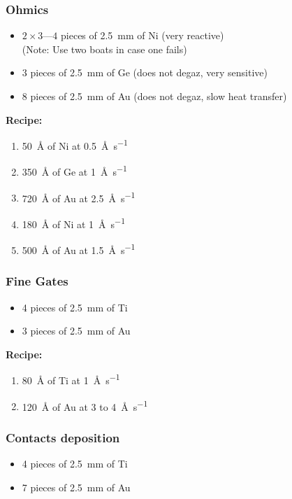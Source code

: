 \subsubsection{Ohmics}
\begin{itemize}
\item $2 \times 3\text{---}4$ pieces of \SI{2.5}{\milli\meter} of Ni (very reactive)\\
  (Note: Use two boats in case one fails)
\item 3 pieces of \SI{2.5}{\milli\meter} of Ge (does not degaz, very sensitive)
\item 8 pieces of \SI{2.5}{\milli\meter} of Au (does not degaz, slow heat transfer)
\end{itemize}

\textbf{Recipe: }
\begin{enumerate}[label=\protect\nth{\value*} layer: ,noitemsep,leftmargin=10em]
\item \SI{50}{\angstrom} of Ni at \SI{0.5}{\angstrom\per\second} 
\item \SI{350}{\angstrom} of Ge at \SI{1}{\angstrom\per\second} 
\item \SI{720}{\angstrom} of Au at \SI{2.5}{\angstrom\per\second} 
\item \SI{180}{\angstrom} of Ni at \SI{1}{\angstrom\per\second} 
\item \SI{500}{\angstrom} of Au at \SI{1.5}{\angstrom\per\second} 
\end{enumerate}

\subsubsection{Fine Gates}
\begin{itemize}
\item 4 pieces of \SI{2.5}{\milli\meter} of Ti
\item 3 pieces of \SI{2.5}{\milli\meter} of Au
\end{itemize}

\textbf{Recipe: }
\begin{enumerate}[label=\protect\nth{\value*} layer: ,noitemsep,leftmargin=10em]
\item \SI{80}{\angstrom} of Ti at \SI{1}{\angstrom\per\second}
\item \SI{120}{\angstrom} of Au at 3 to \SI{4}{\angstrom\per\second}
\end{enumerate}


\subsubsection{Contacts deposition}
\begin{itemize}
\item 4 pieces of \SI{2.5}{\milli\meter} of Ti
\item 7 pieces of \SI{2.5}{\milli\meter} of Au
\end{itemize}

